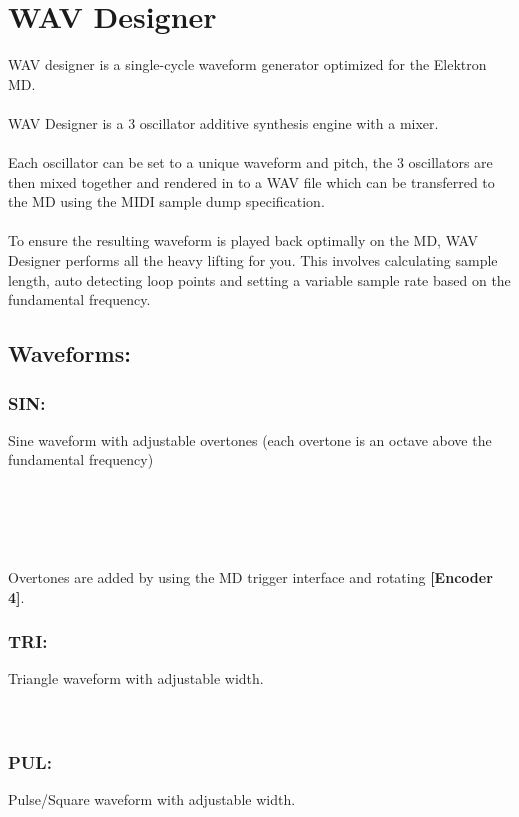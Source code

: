 \chapter{WAV Designer}
WAV designer is a single-cycle waveform generator optimized for the Elektron MD.\\
\\
WAV Designer is a 3 oscillator additive synthesis engine with a mixer.\\
\\
Each oscillator can be set to a unique waveform and pitch, the 3 oscillators are then mixed together and rendered in to a WAV file which can be transferred to the MD using the MIDI sample dump specification.\\
\\
To ensure the resulting waveform is played back optimally on the MD, WAV Designer performs all the heavy lifting for you. This involves calculating sample length, auto detecting loop points and setting a variable sample rate based on the fundamental frequency.

\section{Waveforms:}
\subsection{SIN:}Sine waveform with adjustable overtones (each overtone is an octave above the fundamental frequency)\\
\\\\
\\\\
\\Overtones are added by using the MD trigger interface and rotating \textbf{[Encoder 4]}.
\subsection{TRI:} Triangle waveform with adjustable width.\\
\\\\
\subsection{PUL:} Pulse/Square waveform with adjustable width.\\
\\\\
